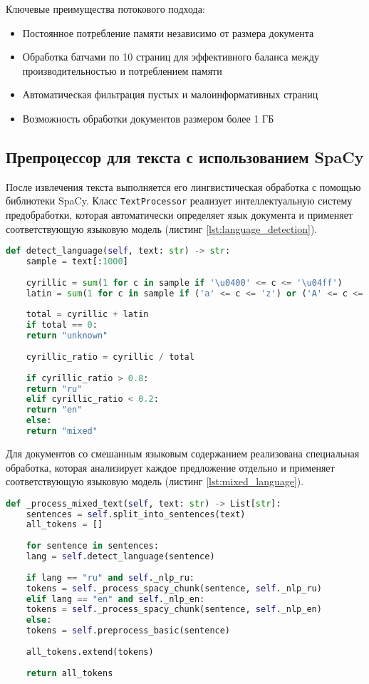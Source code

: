 Ключевые преимущества потокового подхода:
\begin{itemize}
	\item Постоянное потребление памяти независимо от размера документа
	\item Обработка батчами по 10 страниц для эффективного баланса между производительностью и потреблением памяти
	\item Автоматическая фильтрация пустых и малоинформативных страниц
	\item Возможность обработки документов размером более 1 ГБ
\end{itemize}

\subsection{Препроцессор для текста с использованием SpaCy}

После извлечения текста выполняется его лингвистическая обработка с помощью библиотеки SpaCy. Класс \texttt{TextProcessor} реализует интеллектуальную систему предобработки, которая автоматически определяет язык документа и применяет соответствующую языковую модель (листинг \ref{lst:language_detection}).
\clearpage

\begin{lstlisting}[language=Python,caption={Определение языка документа},label=lst:language_detection]
	def detect_language(self, text: str) -> str:
	sample = text[:1000]
	
	cyrillic = sum(1 for c in sample if '\u0400' <= c <= '\u04ff')
	latin = sum(1 for c in sample if ('a' <= c <= 'z') or ('A' <= c <= 'Z'))
	
	total = cyrillic + latin
	if total == 0:
	return "unknown"
	
	cyrillic_ratio = cyrillic / total
	
	if cyrillic_ratio > 0.8:
	return "ru"
	elif cyrillic_ratio < 0.2:
	return "en"
	else:
	return "mixed"
\end{lstlisting}

Для документов со смешанным языковым содержанием реализована специальная обработка, которая анализирует каждое предложение отдельно и применяет соответствующую языковую модель (листинг \ref{lst:mixed_language}).

\begin{lstlisting}[language=Python,caption={Обработка многоязычных документов},label=lst:mixed_language]
	def _process_mixed_text(self, text: str) -> List[str]:
	sentences = self.split_into_sentences(text)
	all_tokens = []
	
	for sentence in sentences:
	lang = self.detect_language(sentence)
	
	if lang == "ru" and self._nlp_ru:
	tokens = self._process_spacy_chunk(sentence, self._nlp_ru)
	elif lang == "en" and self._nlp_en:
	tokens = self._process_spacy_chunk(sentence, self._nlp_en)
	else:
	tokens = self.preprocess_basic(sentence)
	
	all_tokens.extend(tokens)
	
	return all_tokens
\end{lstlisting}

